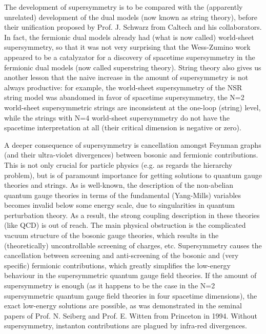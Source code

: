 \documentclass[a4paper,a4paper]{article}
\begin{document}
The development of supersymmetry is to be compared with the (apparently 
unrelated) development of the dual models (now known as string theory), before
their unification proposed by Prof. J. Schwarz from Caltech and his 
collaborators. In fact, the fermionic dual models already had (what is now 
called) world-sheet supersymmetry, so that it was not very surprising that 
the Wess-Zumino work appeared to be a catalyzator for a discovery of 
spacetime supersymmetry in the fermionic dual models (now called superstring 
theory). String theory also gives us another lesson that the naive increase in
the amount of supersymmetry is not always productive: for example, the 
world-sheet supersymmetry of the NSR string model was abandomed in favor of 
spacetime supersymmetry, the N=2 world-sheet supersymmetric strings are 
inconsistent at the one-loop (string) level, while the strings with N=4 
world-sheet supersymmetry do not have the spacetime interpretation at all
(their critical dimension is negative or zero). 

A deeper consequence of supersymmetry is cancellation amongst Feynman graphs
(and their ultra-violet divergences) between bosonic and fermionic 
contributions. This is not only crucial for particle physics (e.g. as regards
the hierarchy problem), but is of paramount importance for getting solutions 
to quantum gauge theories and strings. As is well-known, the description of the
non-abelian quantum gauge theories in terms of the fundamental (Yang-Mills) 
variables becomes invalid below some energy scale, due to singularities in 
quantum perturbation theory. As a result, the strong coupling description in 
these theories (like QCD) is out of reach. The main physical obstruction is the
complicated vacuum structure of the bosonic gauge theories, which results in
the (theoretically) uncontrollable screening of charges, etc. Supersymmetry
causes the cancellation between screening and anti-screening of the bosonic
and (very specific) fermionic contributions, which greatly simplifies the
low-energy behaviour in the supersymmetric quantum gauge field theories. If
the amount of supersymmetry is enough (as it happens to be the case
in the N=2 supersymmetric quantum gauge field theories in four spacetime 
dimensions), the exact low-energy solutions are possible, as was demonstrated 
in the seminal papers of Prof. N. Seiberg and Prof. E. Witten from Princeton 
in 1994. Without supersymmetry, instanton contributions are plagued by
infra-red divergences.
\end{document}
